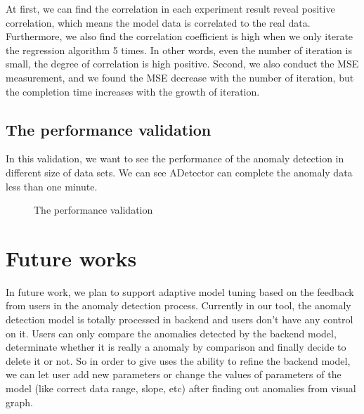 \documentclass{vgtc}                          %
\begin{document}
At first, we can find the correlation in each experiment result reveal positive correlation, which means the model data is correlated to the real data. Furthermore, we also find the correlation coefficient is high when we only iterate the regression algorithm 5 times. In other words, even the number of iteration is small, the degree of correlation is high positive. Second, we also conduct the MSE measurement, and we found the MSE decrease with the number of iteration, but the completion time increases with the growth of iteration.
	
\subsection{The performance validation}
In this validation, we want to see the performance of the anomaly detection in different size of data sets. We can see ADetector can complete the anomaly data less than one minute. 

\begin{figure}[htb]
\begin{center}
\end{center}
	\caption{The performance validation}
	\label{fig:perfValid}
\end{figure} 

\section{Future works}

In future work, we plan to support adaptive model tuning based on the feedback from users in the anomaly detection process. Currently in our tool, the anomaly detection model is totally processed in backend and users don't have any control on it. Users can only compare the anomalies detected by the backend model, determinate whether it is really a anomaly by comparison and finally decide to delete it or not. So in order to give uses the ability to refine the backend model, we can let user add new parameters or change the values of parameters of the model (like correct data range, slope, etc) after finding out anomalies from visual graph.
\end{document}
